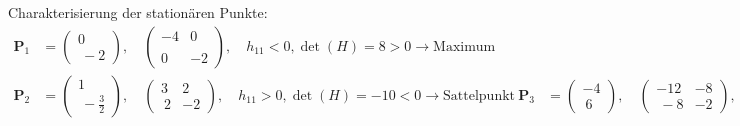 {Charakterisierung der stationären Punkte:
\begin{align*}
\boldsymbol{P}_1 &= \begin{pmatrix} 0 \\\ -2 \end{pmatrix}, \quad \begin{pmatrix} -4 & 0 \\\\ 0 & -2 \end{pmatrix}, \quad h_{11}<0, \det(H)=8>0 \rightarrow \mbox{Maximum}\\
\boldsymbol{P}_2 &= \begin{pmatrix} 1 \\\ -\frac32 \end{pmatrix}, \quad \begin{pmatrix} 3 & 2 \\\ 2 & -2 \end{pmatrix}, \quad h_{11}>0, \det(H)=-10<0 \rightarrow \mbox{Sattelpunkt}\
\boldsymbol{P}_3 &= \begin{pmatrix} -4 \\\ 6 \end{pmatrix}, \quad \begin{pmatrix} -12 & -8 \\\ -8 & -2 \end{pmatrix}, \quad h_{11}<0, \det(H)=-40<0 \rightarrow \mbox{Sattelpunkt}
\end{align*}

}
